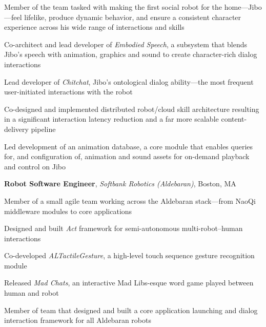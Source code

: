 \documentclass[10pt, letter]{article}
\newcommand{\years}[1]{\marginnote{\footnotesize #1}}
\newenvironment{desc*}{
  \begin{description}
    \setlength{\itemsep}{0.2pt}
    \setlength{\parskip}{-1pt}
    \setlength{\parsep}{0pt}
  }{
  \end{description}
}
\begin{document}
Member of the team tasked with making the first social robot for the home---Jibo---feel lifelike,
produce dynamic behavior, and ensure a consistent character experience across his wide range of
interactions and skills
\begin{itemize}[leftmargin=*, rightmargin=1.5cm]
  {\light
\item Co-architect and lead developer of \textit{Embodied Speech}, a subsystem that blends Jibo's
  speech with animation, graphics and sound to create character-rich dialog interactions
\item Lead developer of \textit{Chitchat}, Jibo's ontological dialog ability---the most frequent user-initiated
  interactions with the robot
\item Co-designed and implemented distributed robot/cloud skill architecture resulting in a
  significant interaction latency reduction and a far more scalable content-delivery pipeline
\item Led development of an animation database, a core module that enables queries for, and
  configuration of, animation and sound assets for on-demand playback and control on Jibo
  }
\end{itemize}
\newpage
\years{2014 - 2016} 
\textbf{Robot Software Engineer},
\textit{Softbank Robotics (Aldebaran)}, Boston, MA\bigskip

Member of a small agile team working across the Aldebaran stack---from NaoQi middleware modules to core applications
\begin{itemize}[leftmargin=*, parsep=1pt, rightmargin=1.5cm]
  {\light
\item Designed and built \textit{Act} framework for semi-autonomous multi-robot--human interactions
\item Co-developed \textit{ALTactileGesture}, a high-level touch sequence gesture recognition module
\item Released \textit{Mad Chats}, an interactive Mad Libs-esque word game played between human and
  robot
\item Member of team that designed and built a core application launching and dialog interaction
  framework for all Aldebaran robots
  }
\end{itemize}
\end{document}
